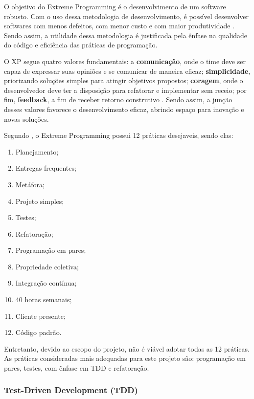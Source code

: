 O objetivo do Extreme Programming é o desenvolvimento de um software robusto. Com o uso dessa metodologia de desenvolvimento, é possível desenvolver softwares com menos defeitos, com menor custo e com maior produtividade \cite{kent_2004}. Sendo assim, a utilidade dessa metodologia é justificada pela ênfase na qualidade do código e eficiência das práticas de programação.

O XP segue quatro valores fundamentais: a \textbf{comunicação}, onde o time deve ser capaz de expressar suas opiniões e se comunicar de maneira eficaz; \textbf{simplicidade}, priorizando soluções simples para atingir objetivos propostos; \textbf{coragem}, onde o desenvolvedor deve ter a disposição para refatorar e implementar sem receio; por fim, \textbf{feedback}, a fim de receber retorno construtivo \cite{kent_2004}. Sendo assim, a junção desses valores favorece o desenvolvimento eficaz, abrindo espaço para inovação e novas soluções.

Segundo , o  Extreme Programming possui 12 práticas desejaveis, sendo elas:

\begin{enumerate}
    \item Planejamento;
    \item Entregas frequentes;
    \item Metáfora;
    \item Projeto simples; 
    \item Testes;
    \item Refatoração;
    \item Programação em pares; 
    \item Propriedade coletiva; 
    \item Integração contínua; 
    \item 40 horas semanais; 
    \item Cliente presente; 
    \item Código padrão.
\end{enumerate}

Entretanto, devido ao escopo do projeto, não é viável adotar todas as 12 práticas. As práticas consideradas mais adequadas para este projeto são: programação em pares, testes, com ênfase em TDD e refatoração.

\subsubsection{Test-Driven Development (TDD)}
\label{subsec:tdd}


